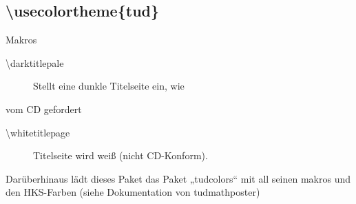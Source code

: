 \documentclass[presentation,t]{beamer}
\begin{document}
\subsection{\textbackslash usecolortheme\{tud\}}
\label{sec-2-5}

\begin{frame}[label=sec-2-5-1]{Makros}
\begin{description}
\item[{\textbackslash darktitlepale}] Stellt eine dunkle Titelseite ein, wie
\end{description}
vom CD gefordert
\begin{description}
\item[{\textbackslash whitetitlepage}] Titelseite wird weiß (nicht CD-Konform).
\end{description}

Darüberhinaus lädt dieses Paket das Paket „tudcolors“ mit all seinen
makros und den HKS-Farben (siehe Dokumentation von tudmathposter)
\end{frame}
\end{document}
